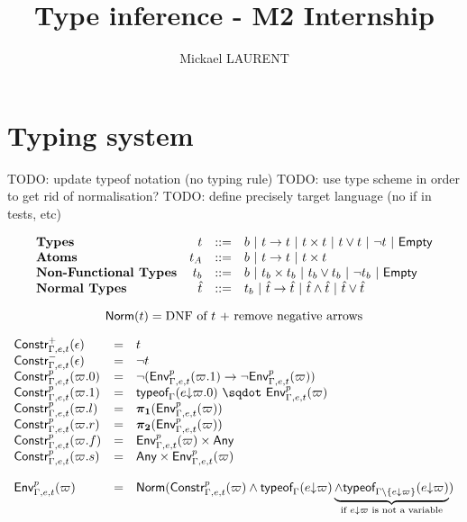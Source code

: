 \documentclass[a4paper]{article}
\title{\vspace{1.5cm}Type inference - M2 Internship}
\author{Mickael LAURENT}
\date{\vspace{-5ex}}
\theoremstyle{definition}
\begin{document}
    \maketitle

    \section{Typing system}

    TODO: update typeof notation (no typing rule)
    TODO: use type scheme in order to get rid of normalisation?
    TODO: define precisely target language (no if in tests, etc)

    \[
      \begin{array}{lrcl}
      \textbf{Types} & t & ::= & b~|~ t\to t~|~ t\times t~|~ t\vee t ~|~ \neg t ~|~ \textsf{Empty}\\
      \textbf{Atoms} & t_A & ::= & b~|~ t\to t~|~ t\times t\\
      \textbf{Non-Functional Types} & t_b & ::= & b ~|~ t_b\times t_b ~|~ t_b\vee t_b ~|~ \neg t_b ~|~ \textsf{Empty}\\
      \textbf{Normal Types} & \hat t & ::= & t_b ~|~ \hat t\to \hat t~|~ \hat t \wedge \hat t ~|~ \hat t\vee \hat t
      \end{array}
    \]

    \[
      \textsf{Norm}(t) = \text{DNF of } t \text{ + remove negative arrows}
    \]

    \[
    \begin{array}{lcl}
      \typep+\epsilon{\Gamma,e,t} & = & t\\
      \typep-\epsilon{\Gamma,e,t} & = & \neg t\\
      \typep{p}{\varpi.0}{\Gamma,e,t} & = & \neg(\arrow{\Gp p{\Gamma,e,t}{(\varpi.1)}}{\neg \Gp p {\Gamma,e,t} (\varpi)})\\
      \typep{p}{\varpi.1}{\Gamma,e,t} & = & \worra{\tyof{\occ e{\varpi.0}}\Gamma}{\Gp p {\Gamma,e,t} (\varpi)}\\
      \typep{p}{\varpi.l}{\Gamma,e,t} & = & \bpl{\Gp p {\Gamma,e,t} (\varpi)}\\
      \typep{p}{\varpi.r}{\Gamma,e,t} & = & \bpr{\Gp p {\Gamma,e,t} (\varpi)}\\
      \typep{p}{\varpi.f}{\Gamma,e,t} & = & \pair{\Gp p {\Gamma,e,t} (\varpi)}\Any\\
      \typep{p}{\varpi.s}{\Gamma,e,t} & = & \pair\Any{\Gp p {\Gamma,e,t} (\varpi)}\\ \\
      \Gp p {\Gamma,e,t} (\varpi) & = & \norm {\typep p \varpi {\Gamma,e,t} \land \tyof {\occ e \varpi} \Gamma
    \underbrace{\land \tyof {\occ e \varpi} {\Gamma\setminus\{\occ e \varpi\}}}_{\text{if $\occ e \varpi$ is not a variable}}}\\
    \end{array}
    \]
\end{document}
